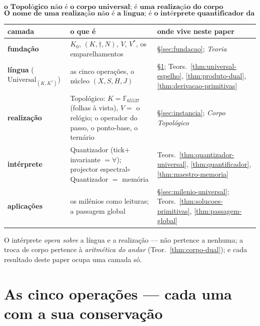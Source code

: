 \documentclass[11pt,a4paper]{article}
\begin{document}
\[
\boxed{\textbf{o Topológico não é o corpo universal; é uma realização
do corpo universal.}}
\]
\[
\boxed{\textbf{O nome de uma realização não é a língua; é o
intérprete quantificador da língua nessa realização.}}
\]
\begin{center}\small
\begin{tabular}{@{}lll@{}}
\toprule
camada & o que é & onde vive neste paper \\
\midrule
\textbf{fundação} & $K_{0}$, $(K,\dagger,N)$, $V$, $V^{*}$, os
  emparelhamentos & \S\ref{sec:fundacao}; \emph{Teoria} \\
\textbf{língua} ($\mathrm{Universal}_{(K,K^{\dagger})}$) & as cinco
  operações, o núcleo $(X,S,H,J)$ &
  \S\ref{sec:cinco}; Teors.~\ref{thm:universal-espelho},
  \ref{thm:produto-dual}, \ref{thm:derivacao-primitivas} \\
\textbf{realização} & Topológico: $K=\mathbb{F}_{65537}$ (folhas à vista),
  $V=$ o relógio; o operador do passo, o ponto-base, o ternário &
  \S\ref{sec:instancia}; \emph{Corpo Topológico} \\
\textbf{intérprete} & Quantizador (tick$+$invariante $=\forall$);
  projector espectral$\circ$Quantizador $=$ memória &
  Teors.~\ref{thm:quantizador-universal}, \ref{thm:quantificador},
  \ref{thm:maestro-memoria} \\
\textbf{aplicações} & os milénios como leituras; a passagem global &
  \S\ref{sec:milenio-universal}; Teors.~\ref{thm:solucoes-primitivas},
  \ref{thm:passagem-global} \\
\bottomrule
\end{tabular}
\end{center}
\noindent O intérprete \emph{opera sobre} a língua e a realização ---
não pertence a nenhuma; a troca de corpo pertence à \emph{aritmética
do andar} (Teor.~\ref{thm:corpo-dual}); e cada resultado deste paper
ocupa uma camada só.

\section{As cinco operações --- cada uma com a sua conservação}\label{sec:cinco}
\end{document}
